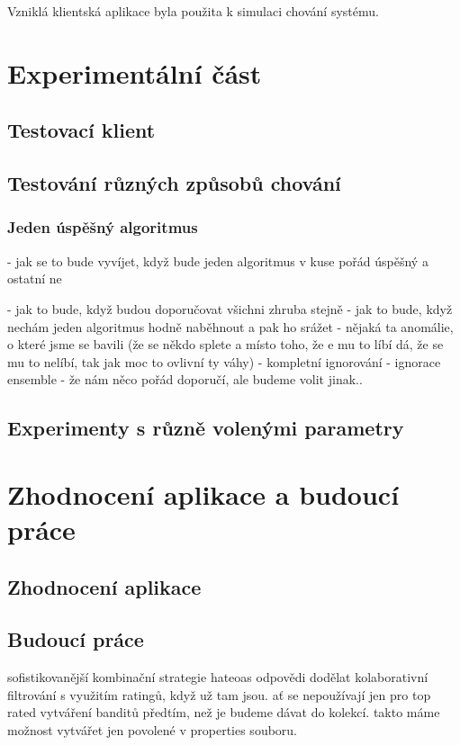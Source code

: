 \documentclass[thesis=M,czech]{FITthesis}[2014/05/07]
\begin{document}
Vzniklá klientská aplikace byla použita k simulaci chování systému.

\chapter{Experimentální část}
\label{chap:tests}

\section{Testovací klient}


\section{Testování různých způsobů chování}

\subsection{Jeden úspěšný algoritmus}
- jak se to bude vyvíjet, když bude jeden algoritmus v kuse pořád
úspěšný a ostatní ne

- jak to bude, když budou doporučovat všichni zhruba stejně
- jak to bude, když nechám jeden algoritmus hodně naběhnout a pak ho srážet
- nějaká ta anomálie, o které jsme se bavili (že se někdo splete a
místo toho, že e mu to líbí dá, že se mu to nelíbí, tak jak moc to
ovlivní ty váhy)
- kompletní ignorování
- ignorace ensemble - že nám něco pořád doporučí, ale budeme volit jinak..

\section{Experimenty s různě volenými parametry}

\chapter{Zhodnocení aplikace a budoucí práce}
\label{chap:futurework}	

\section{Zhodnocení aplikace}

\section{Budoucí práce}
sofistikovanější kombinační strategie
hateoas odpovědi
dodělat kolaborativní filtrování s využitím ratingů, když už tam jsou. ať se nepoužívají jen pro top rated
vytváření banditů předtím, než je budeme dávat do kolekcí. takto máme možnost vytvářet jen povolené v properties souboru.
\end{document}
